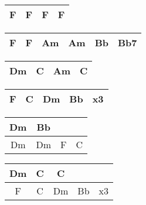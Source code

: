 \begin{tabular}{|c|c|c|c|}
    \hline
    F & F & F & F \\
    \hline
\end{tabular}

\begin{tabular}{|c|c|c|c|c|c|}
    \hline
    F & F & Am & Am & Bb & Bb7 \\
    \hline
\end{tabular}

\begin{tabular}{|c|c|c|c|}
    \hline
    Dm & C & Am & C \\
    \hline
\end{tabular}

\begin{tabular}{|c|c|c|c|c|}
    \hline
    F & C & Dm & Bb & x3 \\
    \hline
\end{tabular}

\begin{tabular}{|c|c|c|c|}
    \hline
    Dm & Bb \\
    \hline
    Dm & Dm & F & C \\
    \hline
\end{tabular}


\begin{tabular}{|c|c|c|c|c|}
    \hline
    Dm & C & C  &    &    \\
    \hline
    F  & C & Dm & Bb & x3 \\
    \hline

\end{tabular}



